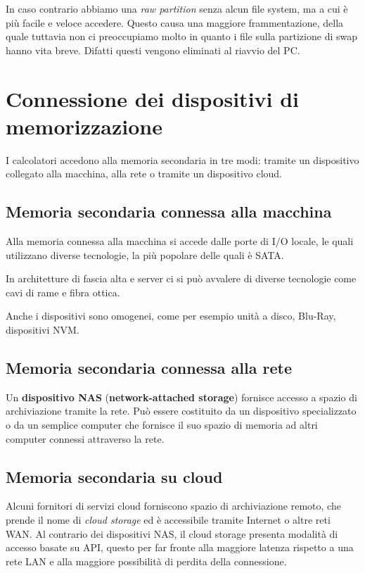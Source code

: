         In caso contrario abbiamo una \textit{raw partition} senza alcun file system, ma a cui  è più facile e veloce accedere. Questo causa una maggiore frammentazione, della quale tuttavia non ci preoccupiamo molto in quanto i file sulla partizione di swap hanno vita breve. Difatti questi vengono eliminati al riavvio del PC.
        
\section{Connessione dei dispositivi di memorizzazione}
    I calcolatori accedono alla memoria secondaria in tre modi: tramite un dispositivo collegato alla macchina, alla rete o tramite un dispositivo cloud.
    
    \subsection{Memoria secondaria connessa alla macchina}
        Alla memoria connessa alla macchina si accede dalle porte di I/O locale, le quali utilizzano diverse tecnologie, la più popolare delle quali è SATA.
        
        In architetture di fascia alta e server ci si può avvalere di diverse tecnologie come cavi di rame e fibra ottica.
        
        Anche i dispositivi sono omogenei, come per esempio unità a disco, Blu-Ray, dispositivi NVM.
        
    \subsection{Memoria secondaria connessa alla rete}
        Un \textbf{dispositivo NAS} (\textbf{network-attached storage}) fornisce accesso a spazio di archiviazione tramite la rete. Può essere costituito da un dispositivo specializzato o da un semplice computer che fornisce il suo spazio di memoria ad altri computer connessi attraverso la rete.
        
    \subsection{Memoria secondaria su cloud}
        Alcuni fornitori di servizi cloud forniscono spazio di archiviazione remoto, che prende il nome di \textit{cloud storage} ed è accessibile tramite Internet o altre reti WAN. Al contrario dei dispositivi NAS, il cloud storage presenta modalità di accesso basate su API, questo per far fronte alla maggiore latenza rispetto a una rete LAN e alla maggiore possibilità di perdita della connessione.
    
